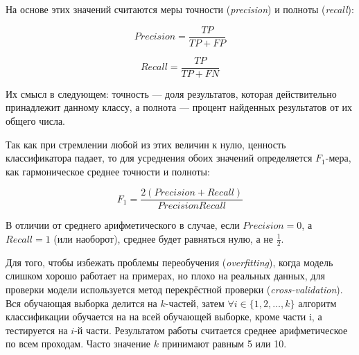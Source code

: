 На основе этих значений считаются меры точности (\textit{precision}) 
и полноты (\textit{recall}):

\begin{equation}
Precision = \frac{TP}{TP+FP}
\end{equation}

\begin{equation}
Recall = \frac{TP}{TP+FN}
\end{equation}

Их смысл в следующем: точность --- доля результатов, которая действительно
принадлежит данному классу, а полнота --- процент найденных результатов
от их общего числа.

Так как при стремлении любой из этих величин к нулю, ценность классификатора 
падает, то для усреднения обоих значений определяется $F_1$-мера, как 
гармоническое среднее точности и полноты:

\begin{equation}
F_1 = \frac{2 (Precision + Recall)}{Precision Recall}
\end{equation}

В отличии от среднего арифметического в случае, если $Precision = 0$, а $Recall = 1$ (или наоборот), среднее будет равняться нулю, а не $\frac{1}{2}$.

Для того, чтобы избежать проблемы переобучения (\textit{overfitting}),
когда модель слишком хорошо работает на примерах, но плохо на реальных данных,
для проверки модели используется метод перекрёстной проверки (\textit{cross-validation}). 
Вся обучающая выборка делится на $k$-частей, затем $\forall i \in \{1, 2, \ldots , k\}$
алгоритм классификации обучается на на всей обучающей выборке, кроме части i,
а тестируется на $i$-й части. Результатом работы считается среднее 
арифметическое по всем проходам. Часто значение $k$ принимают равным 5 или 10.